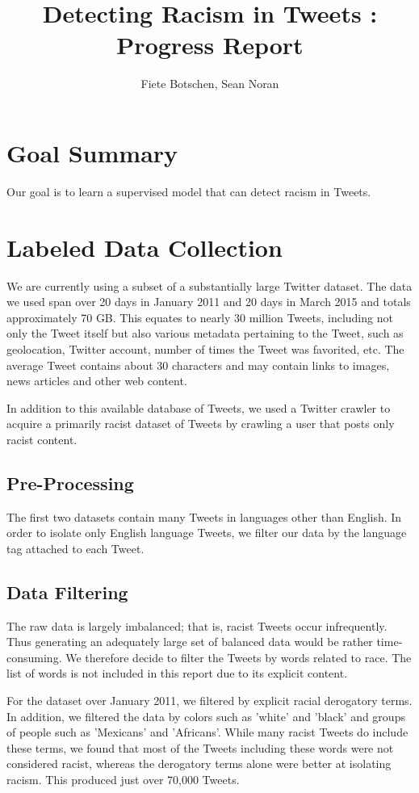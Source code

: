 \documentclass[]{article}
\title{Detecting Racism in Tweets : Progress Report}
\author{Fiete Botschen, Sean Noran}
\begin{document}
\maketitle

\onehalfspacing

\section{Goal Summary}
Our goal is to learn a supervised model that can detect racism in Tweets.

\section{Labeled Data Collection}

We are currently using a subset of a substantially large Twitter dataset. The data we used span over 20 days in January 2011 and 20 days in March 2015 and totals approximately 70 GB. This equates to nearly 30 million Tweets, including not only the Tweet itself but also various metadata pertaining to the Tweet, such as geolocation, Twitter account, number of times the Tweet was favorited, etc. The average Tweet contains about 30 characters and may contain links to images, news articles and other web content.

In addition to this available database of Tweets, we used a Twitter crawler to acquire a primarily racist dataset of Tweets by crawling a user that posts only racist content.

\subsection{Pre-Processing}
The first two datasets contain many Tweets in languages other than English. In order to isolate only English language Tweets, we filter our data by the language tag attached to each Tweet.

\subsection{Data Filtering}

The raw data is largely imbalanced; that is, racist Tweets occur infrequently. Thus generating an adequately large set of balanced data would be rather time-consuming. We therefore decide to filter the Tweets by words related to race. The list of words is not included in this report due to its explicit content.

For the dataset over January 2011, we filtered by explicit racial derogatory terms. In addition, we filtered the data by colors such as 'white' and 'black' and groups of people such as 'Mexicans' and 'Africans'. While many racist Tweets do include these terms, we found that most of the Tweets including these words were not considered racist, whereas the derogatory terms alone were better at isolating racism. This produced just over 70,000 Tweets.
\end{document}
